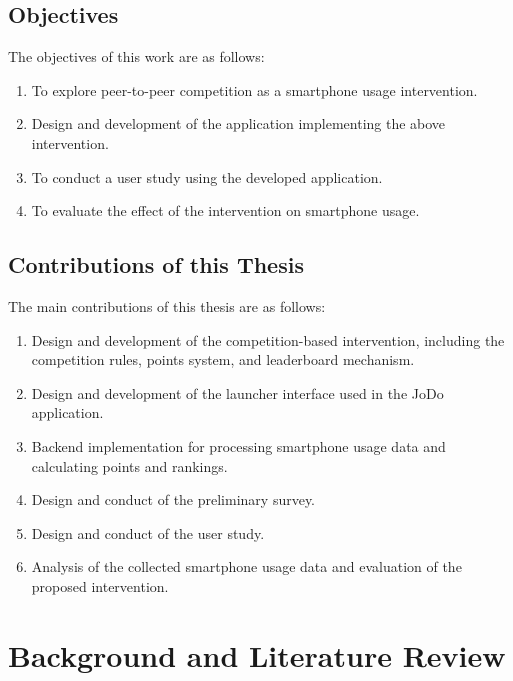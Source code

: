 \documentclass[11pt]{report}
\begin{document}
\section{Objectives}

The objectives of this work are as follows:

\begin{enumerate}
    \item To explore peer-to-peer competition as a smartphone usage intervention.

    \item Design and development of the application implementing the above intervention.

    \item To conduct a user study using the developed application.

    \item To evaluate the effect of the intervention on smartphone usage.
\end{enumerate}

\section{Contributions of this Thesis}

The main contributions of this thesis are as follows:

\begin{enumerate}

\item Design and development of the competition-based intervention, including the competition rules, points system, and leaderboard mechanism.

\item Design and development of the launcher interface used in the JoDo application.

\item Backend implementation for processing smartphone usage data and calculating points and rankings.

\item Design and conduct of the preliminary survey.

\item Design and conduct of the user study.

\item Analysis of the collected smartphone usage data and evaluation of the proposed intervention.
\end{enumerate}


\newpage
\chapter{Background and Literature Review}
\end{document}
